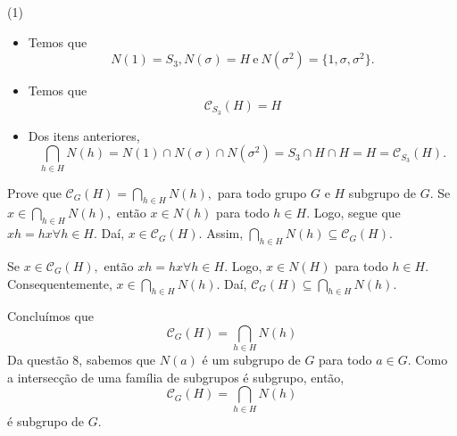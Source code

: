 \documentclass[12pt, a4paper]{article}
\newcommand{\negrito}[1]{\mbox{\boldmath{$#1$}}}
\begin{document}
\begin{tasks}[counter-format={(tsk[a])},label-width=3.6ex, label-format = {\bfseries}, column-sep = {0pt}](1)
\task[\textcolor{Floresta}{$\negrito{(a)} $}] 
\begin{itemize}
\item Temos que \[N(1) = S_3, N(\sigma) = H \ \mbox{e} \ N(\sigma^2) = \{1, \sigma, \sigma^2\}. \] 
\item Temos que \[ \mathcal{C}_{S_3}(H) = H\]
\item Dos itens anteriores,
\[
\bigcap\limits_{h \in H} N(h) = N(1) \cap N(\sigma) \cap N(\sigma^2) = S_3 \cap H \cap H = H = \mathcal{C}_{S_3}(H).
\]
\end{itemize}
\task[\textcolor{Floresta}{$\negrito{(b)} $}] Prove que $\mathcal{C}_{G}(H) = \bigcap\limits_{h \in H} N(h),$ para todo grupo $G$ e $H$ subgrupo de $G.$
Se $x \in \bigcap\limits_{h \in H} N(h),$ então $x \in N(h)$ para todo $h \in H.$ Logo, segue que $xh = hx \forall h \in H.$ Daí, $x \in \mathcal{C}_G(H).$ Assim, $\bigcap\limits_{h \in H} N(h) \subseteq \mathcal{C}_G(H).$

Se $x \in \mathcal{C}_G(H),$ então $xh = hx \forall h \in H.$ Logo, $x \in N(H)$ para todo $h \in H.$ Consequentemente, $x \in \bigcap\limits_{h \in H} N(h).$ Daí, $\mathcal{C}_G(H) \subseteq \bigcap\limits_{h \in H} N(h).$

Concluímos que 
\[
\boxed{\mathcal{C}_{G}(H) = \bigcap\limits_{h \in H} N(h)}
\]
\task[\textcolor{Floresta}{$\negrito{(c)} $}] Da questão 8, sabemos que $N(a)$ é um subgrupo de $G$ para todo $a \in G.$ Como a intersecção de uma família de subgrupos é subgrupo, então,
\[\mathcal{C}_{G}(H) = \bigcap\limits_{h \in H} N(h)
\]
é subgrupo de $G.$
\end{tasks}
\end{document}
